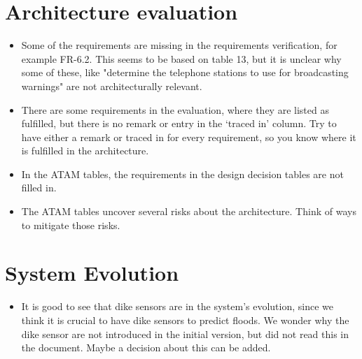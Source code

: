 \documentclass[a4paper,10pt]{article}
\begin{document}
\section{Architecture evaluation}
\begin{itemize}
\item Some of the requirements are missing in the requirements verification, for example FR-6.2. This seems to be based on table 13, but it is unclear why some of these, like "determine the telephone stations to use for broadcasting warnings" are not architecturally relevant.

\item There are some requirements in the evaluation, where they are listed as fulfilled, but there is no remark or entry in the `traced in' column. Try to have either a remark or traced in for every requirement, so you know where it is fulfilled in the architecture.

\item In the ATAM tables, the requirements in the design decision tables are not filled in.

\item The ATAM tables uncover several risks about the architecture. Think of ways to mitigate those risks.
\end{itemize}

\section{System Evolution}
\begin{itemize}
\item It is good to see that dike sensors are in the system's evolution, since we think it is crucial to have dike sensors to predict floods. We wonder why the dike sensor are not introduced in the initial version, but did not read this in the document. Maybe a decision about this can be added.


\end{itemize}
\end{document}
